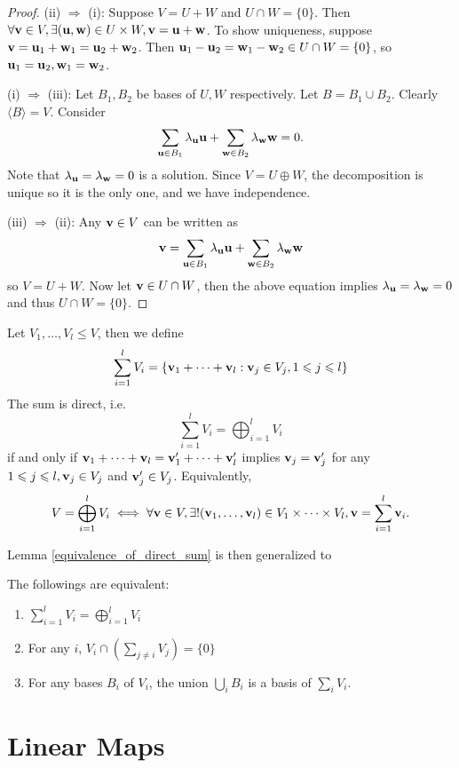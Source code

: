 \documentclass[a4paper,11pt]{article}
\begin{document}
\begin{proof}
    (ii) $\Rightarrow$ (i): Suppose $V=U+W$ and $U\cap W=\{0\}$. Then $ \forall {\bf v}\in V,\exists ({\bf u},{\bf w})\in U\times W,{\bf v}={\bf u}+{\bf w} $. To show uniqueness, suppose $ {\bf v}={\bf u}_1+{\bf w}_1={\bf u}_2+{\bf w}_2 $. Then $ {\bf u}_1-{\bf u}_2={\bf w}_1-{\bf w}_2\in U \cap W=\{0\} $, so $ {\bf u}_1={\bf u}_2,{\bf w}_1={\bf w}_2$.

    (i) $\Rightarrow$ (iii): Let $ B_1,B_2 $ be bases of $U,W$ respectively. Let $ B=B_1 \cup B_2 $. Clearly $ \langle B \rangle =V $. Consider 
    \[
        \sum_{{\bf u}\in B_1}\lambda_{{\bf u}}{\bf u}+\sum_{{\bf w}\in B_2}\lambda_{{\bf w}}{\bf w}=0.
    \]
    Note that $ \lambda_{\bf u}=\lambda_{\bf w}=0 $ is a solution. Since $ V =U\oplus W $, the decomposition is unique so it is the only one, and we have independence.

    (iii) $\Rightarrow$ (ii): Any ${\bf v}\in V$ can be written as 
    \[
        {\bf v}=\sum_{{\bf u}\in B_1}\lambda_{{\bf u}}{\bf u}+\sum_{{\bf w}\in B_2}\lambda_{{\bf w}}{\bf w}
    \]
    so $ V=U+W $. Now let $ {\bf v}\in U\cap W $, then the above equation implies $\lambda_{\bf u}=\lambda_{\bf w}=0 $ and thus $ U\cap W=\{0\} $.
\end{proof}
\begin{definition}
    Let $V_1,\ldots,V_l\le V$, then we define
    $$\sum_{i=1}^lV_i=\{{\bf v}_1+\cdots+{\bf v}_l:{\bf v}_j\in V_j,1\leqslant j\leqslant l\}$$
    The sum is direct, i.e.
    $$\sum_{i=1}^lV_i=\bigoplus_{i=1}^lV_i$$
    if and only if ${\bf v}_1+\cdots +{\bf v}_l={\bf v}_1'+\cdots +{\bf v}_l'$ implies ${\bf v}_j={\bf v}_j'$ for any $1\leqslant j\leqslant l,{\bf v}_j\in V_j$ and $ {\bf v}_j'\in V_j $.
    Equivalently,
    $$V=\bigoplus_{i=1}^lV_i\iff \forall {\bf v}\in V,\exists!({\bf v}_1,\ldots,{\bf v}_l)\in V_1\times\cdots\times V_l,{\bf v}=\sum_{i=1}^l{\bf v}_i.$$
\end{definition}
Lemma \ref{equivalence_of_direct_sum} is then generalized to
\begin{proposition}
    The followings are equivalent:
    \begin{enumerate}
        \item $\sum_{i=1}^lV_i=\bigoplus_{i=1}^lV_i$
        \item For any $i$,
        $V_i\cap\left( \sum_{j\neq i}V_j \right)=\{0\}$
        \item For any bases $B_i$ of $V_i$, the union $\bigcup_iB_i$ is a basis of $\sum_iV_i$.
    \end{enumerate}
\end{proposition}

\section{Linear Maps}
\end{document}
